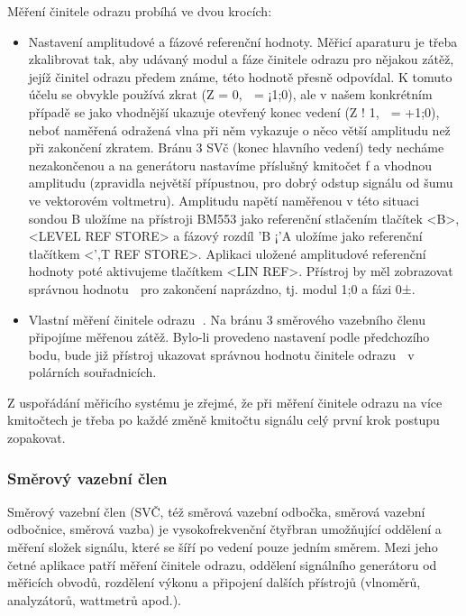         Měření činitele odrazu probíhá ve dvou krocích:
        \begin{itemize}
          \item Nastavení amplitudové a fázové referenční hodnoty. Měřicí aparaturu je třeba 
          zkalibrovat tak, aby udávaný modul a fáze činitele odrazu pro nějakou zátěž, jejíž 
          činitel odrazu předem známe, této hodnotě přesně odpovídal. K tomuto účelu se obvykle 
          používá zkrat (Z = 0, 􀀀 = ¡1;0), ale v našem konkrétním případě se jako vhodnější ukazuje 
          otevřený konec vedení (Z ! 1, 􀀀 = +1;0), neboť naměřená odražená vlna při něm vykazuje o 
          něco větší amplitudu než při zakončení zkratem. Bránu 3 SVč (konec hlavního vedení) tedy 
          necháme nezakončenou a na generátoru nastavíme příslušný kmitočet f a vhodnou amplitudu 
          (zpravidla největší přípustnou, pro dobrý odstup signálu od šumu ve vektorovém 
          voltmetru). Amplitudu napětí naměřenou v této situaci sondou B uložíme na přístroji 
          BM553 jako referenční stlačením tlačítek <B>, <LEVEL REF STORE> a fázový rozdíl 'B ¡'A 
          uložíme jako referenční tlačítkem <',T REF STORE>. Aplikaci uložené amplitudové 
          referenční hodnoty poté aktivujeme tlačítkem <LIN REF>. Přístroj by měl zobrazovat 
          správnou hodnotu 􀀀 pro zakončení naprázdno, tj. modul 1;0 a fázi 0±.
  
          \item Vlastní měření činitele odrazu 􀀀. Na bránu 3 směrového vazebního členu připojíme 
          měřenou zátěž. Bylo-li provedeno nastavení podle předchozího bodu, bude již přístroj 
          ukazovat správnou hodnotu činitele odrazu 􀀀 v polárních souřadnicích.   
        \end{itemize}
        
        Z uspořádání měřicího systému je zřejmé, že při měření činitele odrazu na více kmitočtech 
        je třeba po každé změně kmitočtu signálu celý první krok postupu zopakovat.
  
      \subsubsection{Směrový vazební člen}     
        Směrový vazební člen (SVČ, též směrová vazební odbočka, směrová vazební odbočnice, směrová 
        vazba) je vysokofrekvenční čtyřbran umožňující oddělení a měření složek signálu, které se 
        šíří po vedení pouze jedním směrem. Mezi jeho četné aplikace patří měření činitele odrazu, 
        oddělení signálního generátoru od měřicích obvodů, rozdělení výkonu a připojení dalších 
        přístrojů (vlnoměrů, analyzátorů, wattmetrů apod.).
  
